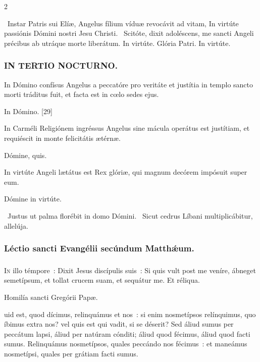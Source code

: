 \documentclass[9pt,twoside]{extarticle}
\begin{document}
\begin{multicols}{2}
\begin{tightlist}{}
\item {}~Instar Patris sui Elíæ, Angelus fílium víduæ revocávit ad vitam, \textred{*} In virtúte passiónis Dómini nostri Jesu Christi.
~Scitóte, dixit adoléscens, me sancti Angeli précibus ab utráque morte liberátum. In virtúte. Glória Patri. In virtúte.
\end{tightlist}

\subsubsection*{\center \textsc{IN TERTIO NOCTURNO.}}
\begin{tightlist}{}
\item {} In Dómino confísus Angelus a peccatóre pro veritáte et justítia in templo sancto morti tráditus fuit, et facta est in cœlo sedes ejus.
\item {} In Dómino. [29]
\item {} In Carméli Religiónem ingréssus Angelus sine mácula operátus est justítiam, et requiéscit in monte felicitátis ætérnæ.
\item {} Dómine, quis.
\item {} In virtúte Angeli lætátus est Rex glóriæ, qui magnum decórem impósuit super eum.
\item {} Dómine in virtúte.
\item {}~Justus ut palma florébit in domo Dómini. ~Sicut cedrus Líbani multiplicábitur, allelúja.
\end{tightlist}

\subsubsection*{\center Léctio sancti Evangélii secúndum Matthǽum.}
\subsubsection*{\center {}}
\lettrine{I}n illo témpore~: Dixit Jesus discípulis suis~: Si quis vult post me veníre, ábneget semetípsum, et tollat crucem suam, et sequátur me. Et réliqua.

\begin{center}Homilía sancti Gregórii Papæ.\\
\end{center}
uid est, quod dícimus, relinquámus et nos~: si enim nosmetípsos relínquimus, quo íbimus extra nos? vel quis est qui vadit, si se déserit? Sed áliud sumus per peccátum lapsi, áliud per natúram cónditi; áliud quod fécimus, áliud quod facti sumus. Relinquámus nosmetípsos, quales peccándo nos fécimus~: et maneámus nosmetípsi, quales per grátiam facti sumus.


\end{multicols}
\end{document}
